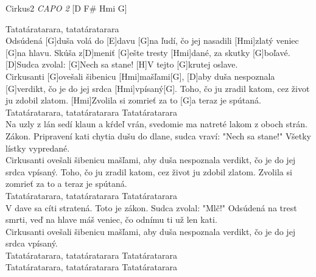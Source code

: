 \documentclass[12pt]{article}
\begin{document}
\begin{song}{Cirkus}{2}
	\textit{CAPO 2}
	[D F# Hmi G]
	
	Tatatáratarara, tatatáratarara
	\\
	[D]Odsúdená [G]duša volá do [E]davu
	[G]na ľudí, čo jej nasadili [Hmi]zlatý veniec [G]na hlavu.
	Skúša z[D]meniť [G]ešte tresty [Hmi]dané,
	za skutky [G]boľavé.
	[D]Sudca zvolal: [G]Nech sa stane!
	[H]V tejto [G]krutej oslave.
	\\
	[D]Cirkusanti [G]ovešali šibenicu [Hmi]mašľami[G],
	[D]aby duša nespoznala [G]verdikt,
	čo je do jej srdca [Hmi]vpísaný[G].
	Toho, čo ju zradil katom,
	cez život ju zdobil zlatom.
	[Hmi]Zvolila si zomrieť za to [G]a teraz je spútaná.
	\\
	Tatatáratarara, tatatáratarara
	Tatatáratarara
	\\
	Na uzly z lán sedí klaun a kŕdeľ vrán,
	svedomie ma natreté lakom z oboch strán.
	Zákon. Pripravení kati chytia dušu do dlane,
	sudca vraví: "Nech sa stane!"
	Všetky lístky vypredané.
	\\
	Cirkusanti ovešali šibenicu mašľami,
	aby duša nespoznala verdikt,
	čo je do jej srdca vpísaný.
	Toho, čo ju zradil katom,
	cez život ju zdobil zlatom.
	Zvolila si zomrieť za to a teraz je spútaná.
	\\
	Tatatáratarara, tatatáratarara
	Tatatáratarara
	\\
	V dave sa cíti stratená.
	Toto je zákon.
	Sudca zvolal: "Mlč!"
	Odsúdená na trest smrti,
	veď na hlave máš veniec,
	čo odnímu ti už len kati.
	\\
	Cirkusanti ovešali šibenicu mašľami,
	aby duša nespoznala verdikt,
	čo je do jej srdca vpísaný.
	\\
	Tatatáratarara, tatatáratarara
	Tatatáratarara
	\\
	Tatatáratarara, tatatáratarara
	Tatatáratarara
\end{song}
\end{document}
